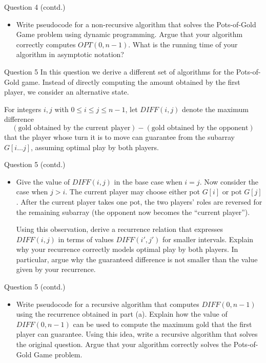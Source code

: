 \documentclass{beamer}
\begin{document}
\begin{frame}{Question 4 (contd.)}
\begin{itemize}
  \item[(e)] Write pseudocode for a non-recursive algorithm that solves the Pots-of-Gold Game problem using dynamic programming. Argue that your algorithm correctly computes $OPT(0, n-1)$. What is the running time of your algorithm in asymptotic notation?
\end{itemize}
\end{frame}

\begin{frame}{Question 5}
In this question we derive a different set of algorithms for the Pots-of-Gold game. Instead of
directly computing the amount obtained by the first player, we consider an alternative state.

\medskip
For integers $i, j$ with $0 \leq i \leq j \leq n-1$, let $DIFF(i, j)$ denote the maximum difference
\[
(\text{gold obtained by the current player}) - (\text{gold obtained by the opponent})
\]
that the player whose turn it is to move can guarantee from the subarray $G[i\ldots j]$, assuming optimal play by both players.
\end{frame}

\begin{frame}{Question 5 (contd.)}
\begin{itemize}
  \item[(a)] Give the value of $DIFF(i,j)$ in the base case when $i = j$. Now consider the case when $j > i$. The current player may choose either pot $G[i]$ or pot $G[j]$. After the current player takes one pot, the two players' roles are reversed for the remaining subarray (the opponent now becomes the ``current player'').

  Using this observation, derive a recurrence relation that expresses $DIFF(i,j)$ in terms of values $DIFF(i', j')$ for smaller intervals. Explain why your recurrence correctly models optimal play by both players. In particular, argue why the guaranteed difference is not smaller than the value given by your recurrence.
\end{itemize}
\end{frame}

\begin{frame}{Question 5 (contd.)}
\begin{itemize}
  \item[(b)] Write pseudocode for a recursive algorithm that computes $DIFF(0, n-1)$ using the recurrence obtained in part (a). Explain how the value of $DIFF(0, n-1)$ can be used to compute the maximum gold that the first player can guarantee. Using this idea, write a recursive algorithm that solves the original question. Argue that your algorithm correctly solves the Pots-of-Gold Game problem.
\end{itemize}
\end{frame}
\end{document}
